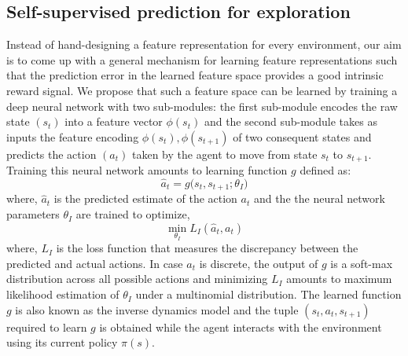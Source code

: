 \documentclass{article}
\begin{document}
\subsection{Self-supervised prediction for exploration}
Instead of hand-designing a feature representation for every environment, our aim is to come up with a general mechanism for learning feature representations such that the prediction error in the learned feature space provides a good intrinsic reward signal. We propose that such a feature space can be learned by training a deep neural network with two sub-modules: the first sub-module encodes the raw state $(s_t)$ into a feature vector $\phi(s_t)$ and the second sub-module takes as inputs the feature encoding $\phi(s_t), \phi(s_{t+1})$ of two consequent states and predicts the action $(a_t)$ taken by the agent to move from state $s_t$ to $s_{t+1}$. Training this neural network amounts to learning function $g$ defined as:
\begin{equation}
    \hat{a}_t = g\Big(s_t, s_{t+1}; \theta_I\Big)
\end{equation}
where, $\hat{a}_t$ is the predicted estimate of the action $a_t$ and the the neural network parameters $\theta_I$ are trained to optimize,
\begin{equation}
   \label{eq:loss_inverse}
   \min_{\theta_I}L_I(\hat{a}_t, a_t)
\end{equation}
where, $L_I$ is the loss function that measures the discrepancy between the predicted and actual actions. In case $a_t$ is discrete, the output of $g$ is a soft-max distribution across all possible actions and minimizing $L_I$ amounts to maximum likelihood estimation of $\theta_I$ under a multinomial distribution.  The learned function $g$ is also known as the inverse dynamics model and the tuple $(s_t, a_t, s_{t+1})$ required to learn $g$ is obtained while the agent interacts with the environment using its current policy $\pi(s)$.
\end{document}
